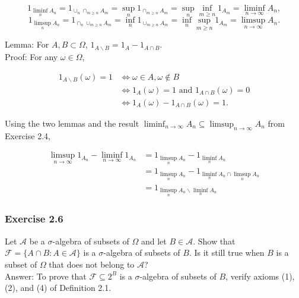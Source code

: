 \documentclass{article}
\begin{document}
$$
1_{\liminf_n A_n} = 1_{\cup_n \cap_{m\geq n} A_m} = \sup_n 1_{\cap_{m\geq n} A_m} = \sup_n \inf_{m\geq n} 1_{A_m} = \liminf_{n\rightarrow \infty} A_n,
$$
$$
1_{\limsup_n A_n} = 1_{\cap_n \cup_{m\geq n} A_m} = \inf_n 1_{\cup_{m\geq n} A_m} = \inf_n \sup_{m\geq n} 1_{A_m} = \limsup_{n\rightarrow \infty} A_n.
$$

Lemma: For $A,B \subset \Omega$, $1_{A \backslash B} = 1_A - 1_{A\cap B}$. \\

Proof: For any $\omega \in \Omega$,

\begin{align*}
1_{A\backslash B}(\omega) = 1 &\iff \omega \in A, \omega \not\in B \\
& \iff 1_A(\omega) = 1 \text{ and } 1_{A \cap B}(\omega) = 0 \\
& \iff 1_A(\omega) - 1_{A\cap B}(\omega) = 1.
\end{align*}

Using the two lemmas and the result $\liminf_{n\rightarrow \infty} A_n \subseteq \limsup_{n\rightarrow \infty} A_n$ from Exercise 2.4,

\begin{align*}
\limsup_{n \rightarrow \infty} 1_{A_n} - \liminf_{n \rightarrow \infty} 1_{A_n} 
&=  1_{\limsup_n A_n} - 1_{\liminf_n A_n} \\
&= 1_{\limsup_{n} A_n} - 1_{\liminf_{n} A_n \cap \limsup_{n} A_n} \\
&= 1_{\limsup_{n} A_n \backslash \liminf_{n} A_n}
\end{align*}


\subsubsection*{Exercise 2.6}

Let $\mathcal{A}$ be a $\sigma$-algebra of subsets of $\Omega$ and let $B \in \mathcal{A}$. Show that $\mathcal{F} = \{A \cap B : A \in \mathcal{A}\}$ is a $\sigma$-algebra of subsets of $B$. Is it still true when $B$ is a
subset of $\Omega$ that does not belong to $\mathcal{A}$?\\

Answer: To prove that $\mathcal{F}\subseteq 2^B$ is a $\sigma$-algebra of subsets of $B$, verify axioms (1), (2), and (4) of Definition 2.1.
\end{document}
